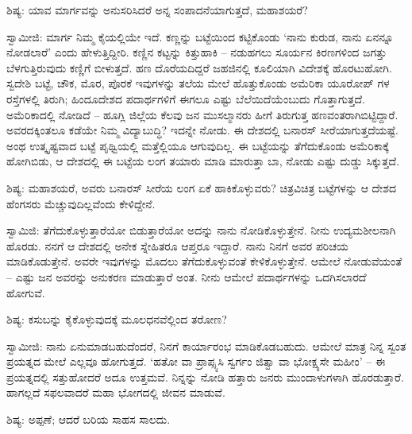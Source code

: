 ಶಿಷ್ಯ: ಯಾವ ಮಾರ್ಗವನ್ನು ಅನುಸರಿಸಿದರೆ ಅನ್ನ ಸಂಪಾದನೆಯಾಗುತ್ತದೆ, ಮಹಾಶಯರೆ?

ಸ್ವಾಮೀಜಿ: ಮಾರ್ಗ ನಿಮ್ಮ ಕೈಯಲ್ಲಿಯೇ ಇದೆ. ಕಣ್ಣನ್ನು ಬಟ್ಟೆಯಿಂದ ಕಟ್ಟಿಕೊಂಡು ‘ನಾನು ಕುರುಡ, ನಾನು ಏನನ್ನೂ ನೋಡಲಾರೆ’ ಎಂದು ಹೇಳುತ್ತಿದ್ದೀರಿ. ಕಣ್ಣಿನ ಕಟ್ಟನ್ನು ಕಿತ್ತುಹಾಕಿ – ನಡುಹಗಲು ಸೂರ್ಯನ ಕಿರಣಗಳಿಂದ ಜಗತ್ತು ಬೆಳಗುತ್ತಿರುವುದು ಕಣ್ಣಿಗೆ ಬೀಳುತ್ತದೆ. ಹಣ ದೊರೆಯದಿದ್ದರೆ ಜಹಜಿನಲ್ಲಿ ಕೂಲಿಯಾಗಿ ವಿದೇಶಕ್ಕೆ ಹೊರಟುಹೋಗಿ. ಸ್ವದೇಶಿ ಬಟ್ಟೆ, ಚೌಕ, ಮೊರ, ಪೊರಕೆ ಇವುಗಳನ್ನು ತಲೆಯ ಮೇಲೆ ಹೊತ್ತುಕೊಂಡು ಅಮೆರಿಕಾ ಯೂರೋಪ್ ಗಳ ರಸ್ತೆಗಳಲ್ಲಿ ತಿರುಗಿ; ಹಿಂದೂದೇಶದ ಪದಾರ್ಥಗಳಿಗೆ ಈಗಲೂ ಎಷ್ಟು ಬೆಲೆಯಿದೆಯೆಂಬುದು ಗೊತ್ತಾಗುತ್ತದೆ. ಅಮೆರಿಕಾದಲ್ಲಿ ನೋಡಿದೆ – ಹೂಗ್ಲಿ ಜಿಲ್ಲೆಯ ಕೆಲವು ಜನ ಮುಸಲ್ಮಾನರು ಹೀಗೆ ತಿರುಗುತ್ತ ಹಣವಂತರಾಗಿಬಿಟ್ಟಿದ್ದಾರೆ. ಅವರದಕ್ಕಿಂತಲೂ ಕಡೆಯೇ ನಿಮ್ಮ ವಿದ್ಯಾಬುದ್ಧಿ? ಇದನ್ನೇ ನೋಡು. ಈ ದೇಶದಲ್ಲಿ ಬನಾರಸ್ ಸೀರೆಯಾಗುತ್ತದೆಯಷ್ಟೆ. ಅಂಥ ಉತ್ಕೃಷ್ಟವಾದ ಬಟ್ಟೆ ಪೃಥ್ವಿಯಲ್ಲಿ ಮತ್ತೆಲ್ಲಿಯೂ ಆಗುವುದಿಲ್ಲ. ಈ ಬಟ್ಟೆಯನ್ನು ತೆಗೆದುಕೊಂಡು ಅಮೆರಿಕಾಕ್ಕೆ ಹೋಗಿಬಿಡು, ಆ ದೇಶದಲ್ಲಿ ಈ ಬಟ್ಟೆಯ ಲಂಗ ತಯಾರು ಮಾಡಿ ಮಾರುತ್ತಾ ಬಾ, ನೋಡು ಎಷ್ಟು ದುಡ್ಡು ಸಿಕ್ಕುತ್ತದೆ.

ಶಿಷ್ಯ: ಮಹಾಶಯರೆ, ಅವರು ಬನಾರಸ್ ಸೀರೆಯ ಲಂಗ ಏಕೆ ಹಾಕಿಕೊಳ್ಳುವರು? ಚಿತ್ರವಿಚಿತ್ರ ಬಟ್ಟೆಗಳನ್ನು ಆ ದೇಶದ ಹೆಂಗಸರು ಮೆಚ್ಚುವುದಿಲ್ಲವೆಂದು ಕೇಳಿದ್ದೇನೆ.

ಸ್ವಾಮಿಜಿ: ತೆಗೆದುಕೊಳ್ಳುತ್ತಾರೆಯೋ ಬಿಡುತ್ತಾರೆಯೋ ಅದನ್ನು ನಾನು ನೋಡಿಕೊಳ್ಳುತ್ತೇನೆ. ನೀನು ಉದ್ಯಮಶೀಲನಾಗಿ ಹೊರಡು. ನನಗೆ ಆ ದೇಶದಲ್ಲಿ ಅನೇಕ ಸ್ನೇಹಿತರೂ ಆಪ್ತರೂ ಇದ್ದಾರೆ. ನಾನು ನಿನಗೆ ಅವರ ಪರಿಚಯ ಮಾಡಿಕೊಡುತ್ತೇನೆ. ಅವರೇ ಇವುಗಳನ್ನು ಮೊದಲು ತೆಗೆದುಕೊಳ್ಳುವಂತೆ ಕೇಳಿಕೊಳ್ಳುತ್ತೇನೆ. ಆಮೇಲೆ ನೋಡುವೆಯಂತೆ – ಎಷ್ಟು ಜನ ಅವರನ್ನು ಅನುಕರಣ ಮಾಡುತ್ತಾರೆ ಅಂತ. ನೀನು ಆಮೇಲೆ ಪದಾರ್ಥಗಳನ್ನು ಒದಗಿಸಲಾರದೆ ಹೋಗುವೆ.

ಶಿಷ್ಯ: ಕಸುಬನ್ನು ಕೈಕೊಳ್ಳುವುದಕ್ಕೆ ಮೂಲಧನವೆಲ್ಲಿಂದ ತರೋಣ?

ಸ್ವಾಮೀಜಿ: ನಾನು ಏನುಮಾಡಬಹುದೆಂದರೆ, ನಿನಗೆ ಕಾರ್ಯಾರಂಭ ಮಾಡಿಕೊಡಬಹುದು. ಆಮೇಲೆ ಮಾತ್ರ ನಿನ್ನ ಸ್ವಂತ ಪ್ರಯತ್ನದ ಮೇಲೆ ಎಲ್ಲವೂ ಹೋಗುತ್ತದೆ. ‘ಹತೋ ವಾ ಪ್ರಾಪ್ಸ್ಯಸಿ ಸ್ವರ್ಗಂ ಜಿತ್ವಾ ವಾ ಭೋಕ್ಷ್ಯಸೇ ಮಹೀಂ’ – ಈ ಪ್ರಯತ್ನದಲ್ಲಿ ಸತ್ತುಹೋದರೆ ಅದೂ ಉತ್ತಮವೆ. ನಿನ್ನನ್ನು ನೋಡಿ ಹತ್ತಾರು ಜನರು ಮುಂದಾಳುಗಳಾಗಿ ಹೊರಡುತ್ತಾರೆ. ಹಾಗಲ್ಲದೆ ಸಫಲವಾದರೆ ಮಹಾ ಭೋಗದಲ್ಲಿ ಜೀವನ ಮಾಡುವೆ.

ಶಿಷ್ಯ: ಅಪ್ಪಣೆ; ಆದರೆ ಬರಿಯ ಸಾಹಸ ಸಾಲದು.

